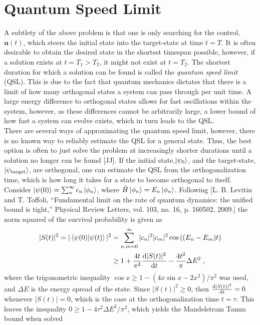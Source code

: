 \section{Quantum Speed Limit}
A subtlety of the above problem is that one is only searching for the control, $\boldsymbol{u}(t)$, which steers the initial state into the target-state at time $t = T$. It is often desirable to obtain the desired state in the shortest timespan possible, however, if a solution exists at $t= T_1 > T_2$, it might not exist at $t = T_2$. The shortest duration for which a solution can be found is called the \textit{quantum speed limit} (QSL). This is due to the fact that quantum mechanics dictates that there is a limit of how many orthogonal states a system can pass through per unit time. A large energy difference to orthogonal states allows for fast oscillations within the system, however, as these differences cannot be arbitrarily large, a lower bound of how fast a system can evolve exists, which in turn leads to the QSL.\\
There are several ways of approximating the quantum speed limit, however, there is no known way to reliably estimate the QSL for a general state. Thus, the best option is often to just solve the problem at increasingly shorter durations until a solution no longer can be found [JJ]. 
If the initial state,$\ket{\psi_0}$, and the target-state, $\ket{\psi_{\mathrm{target}}}$, are orthogonal, one can estimate the QSL from the orthogonalization time, which is how long it takes for a state to become orthogonal to itself.
Consider $\ket{\psi (0)} = \sum_{n}^{\infty} c_n \ket{\phi _n}$, where $\hat{H} \ket{\phi _n} = E_n \ket{\phi _n}$. Following [L. B. Levitin and T. Toffoli, “Fundamental limit on the rate of quantum dynamics: the unified bound is tight,”
Physical Review Letters, vol. 103, no. 16, p. 160502, 2009.] the norm squared of the survival probability is given as
\begin{align}
	|S(t)|^2 = |\braket{\psi (0) | \psi (t)}|^2 &= \sum_{n , m = 0}^{\infty} |c_n|^2 |c_m|^2 \cos \left( (E_n - E_m) t \right) \nonumber \\
	&\geq 1 + \frac{4 t}{\pi ^2} \dv{|S(t)|^2}{t} - \frac{4 t^2}{\pi} \Delta E^2 \; ,
\end{align}
where the trigonometric inequality $\cos x \geq 1 - \left( 4 x \sin x - 2 x^2 \right) / \pi^2$ was used, and $\Delta E$ is the energy spread of the state.
Since $|S(t)|^2 \geq 0$, then $\dv{|S(t)|^2}{t} = 0$ whenever $|S(t)| = 0$, which is the case at the orthogonalization time $t = \tau$. This leaves the inequality $0 \geq 1 - 4 \tau^2 \Delta E^2 / \pi^2$, which yields the Mandelstram Tamm bound when solved
